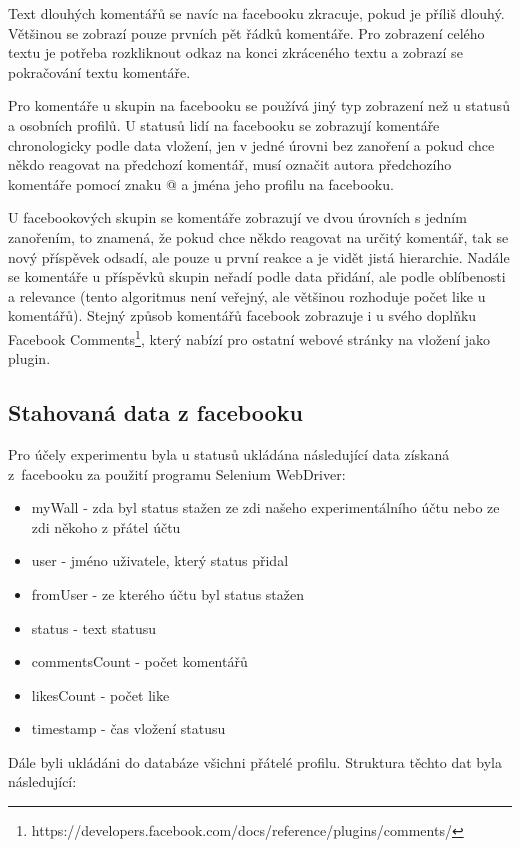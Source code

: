 \documentclass[thesis=M,czech]{FITthesis}[2013/05/10]
\begin{document}
Text dlouhých komentářů se navíc na facebooku zkracuje, pokud je příliš dlouhý. Většinou se zobrazí pouze prvních pět řádků komentáře. Pro zobrazení celého textu je potřeba rozkliknout odkaz na konci zkráceného textu a zobrazí se pokračování textu komentáře. 

Pro komentáře u skupin na facebooku se používá jiný typ zobrazení než u statusů a osobních profilů. U statusů lidí na facebooku se zobrazují komentáře chronologicky podle data vložení, jen v jedné úrovni bez zanoření a pokud chce někdo reagovat na předchozí komentář, musí označit autora předchozího komentáře pomocí znaku @ a jména jeho profilu na facebooku. 

U facebookových skupin se komentáře zobrazují ve dvou úrovních s jedním zanořením, to znamená, že pokud chce někdo reagovat na určitý komentář, tak se nový příspěvek odsadí, ale pouze u první reakce a je vidět jistá hierarchie. Nadále se komentáře u příspěvků skupin neřadí podle data přidání, ale podle oblíbenosti a relevance (tento algoritmus není veřejný, ale většinou rozhoduje počet like u komentářů). Stejný způsob komentářů facebook zobrazuje i u svého doplňku Facebook Comments\footnote{https://developers.facebook.com/docs/reference/plugins/comments/}, který nabízí pro ostatní webové stránky na vložení jako plugin. 

\subsection{Stahovaná data z facebooku}

Pro účely experimentu byla u statusů ukládána následující data získaná z~facebooku za použití programu Selenium WebDriver:

\begin{itemize}
  \item myWall - zda byl status stažen ze zdi našeho experimentálního účtu nebo ze zdi někoho z přátel účtu
  \item user - jméno uživatele, který status přidal
  \item fromUser - ze kterého účtu byl status stažen  
  \item status - text statusu
  \item commentsCount - počet komentářů
  \item likesCount - počet like
  \item timestamp - čas vložení statusu
\end{itemize}

Dále byli ukládáni do databáze všichni přátelé profilu. Struktura těchto dat byla následující:
\end{document}

